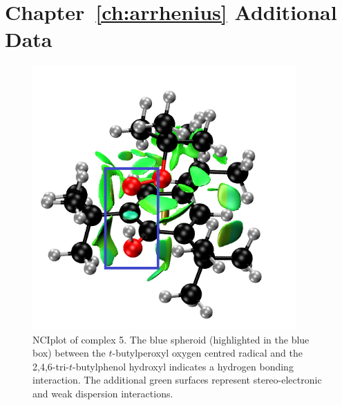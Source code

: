 
\chapter{Chapter~\protect\ref{ch:arrhenius} Additional Data}\label{ap:arrhenius}

\begin{figure}[H]
  \centering
  \includegraphics[width=0.9\textwidth]{figures/nciplot.png}
  \caption[NCIplot of complex 5.]{NCIplot\cite{Johnson2010,ContrerasGarcia2011} of complex 5. The blue spheroid (highlighted in the blue box) between the $t$-butylperoxyl oxygen centred radical and the 2,4,6-tri-$t$-butylphenol hydroxyl indicates a hydrogen bonding interaction. The additional green surfaces represent stereo-electronic and weak dispersion interactions.}
  \label{fig:nciplot}
\end{figure}


